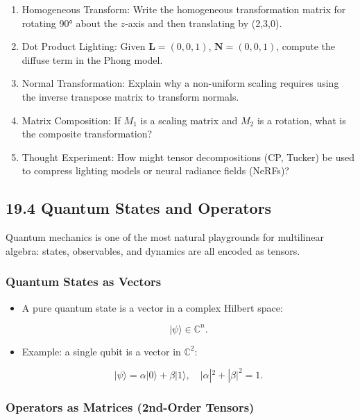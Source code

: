\documentclass[
  letterpaper,
  DIV=11,
  numbers=noendperiod]{scrreprt}
\begin{document}
\begin{enumerate}
\def\labelenumi{\arabic{enumi}.}
\item
  Homogeneous Transform: Write the homogeneous transformation matrix for
  rotating 90° about the \(z\)-axis and then translating by (2,3,0).
\item
  Dot Product Lighting: Given \(\mathbf{L} = (0,0,1)\),
  \(\mathbf{N} = (0,0,1)\), compute the diffuse term in the Phong model.
\item
  Normal Transformation: Explain why a non-uniform scaling requires
  using the inverse transpose matrix to transform normals.
\item
  Matrix Composition: If \(M_1\) is a scaling matrix and \(M_2\) is a
  rotation, what is the composite transformation?
\item
  Thought Experiment: How might tensor decompositions (CP, Tucker) be
  used to compress lighting models or neural radiance fields (NeRFs)?
\end{enumerate}

\subsection{19.4 Quantum States and
Operators}\label{quantum-states-and-operators}

Quantum mechanics is one of the most natural playgrounds for multilinear
algebra: states, observables, and dynamics are all encoded as tensors.

\subsubsection{Quantum States as
Vectors}\label{quantum-states-as-vectors}

\begin{itemize}
\item
  A pure quantum state is a vector in a complex Hilbert space:

  \[
  |\psi\rangle \in \mathbb{C}^n.
  \]
\item
  Example: a single qubit is a vector in \(\mathbb{C}^2\):

  \[
  |\psi\rangle = \alpha |0\rangle + \beta |1\rangle, \quad |\alpha|^2 + |\beta|^2 = 1.
  \]
\end{itemize}

\subsubsection{Operators as Matrices (2nd-Order
Tensors)}\label{operators-as-matrices-2nd-order-tensors}
\end{document}

